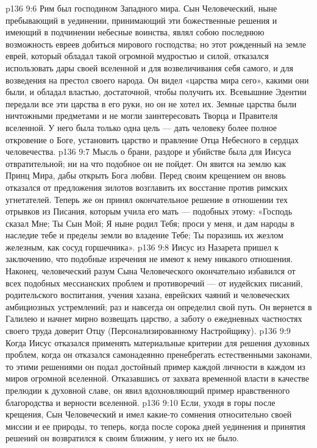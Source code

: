 \vs p136 9:6 Рим был господином Западного мира. Сын Человеческий, ныне пребывающий в уединении, принимающий эти божественные решения и имеющий в подчинении небесные воинства, являл собою последнюю возможность евреев добиться мирового господства; но этот рожденный на земле еврей, который обладал такой огромной мудростью и силой, отказался использовать дары своей вселенной и для возвеличивания себя самого, и для возведения на престол своего народа. Он видел «царства мира сего», какими они были, и обладал властью, достаточной, чтобы получить их. Всевышние Эдентии передали все эти царства в его руки, но он не хотел их. Земные царства были ничтожными предметами и не могли заинтересовать Творца и Правителя вселенной. У него была только одна цель --- дать человеку более полное откровение о Боге, установить царство и правление Отца Небесного в сердцах человечества.
\vs p136 9:7 Мысль о брани, раздоре и убийстве была для Иисуса отвратительной; ни на что подобное он не пойдет. Он явится на землю как Принц Мира, дабы открыть Бога любви. Перед своим крещением он вновь отказался от предложения зилотов возглавить их восстание против римских угнетателей. Теперь же он принял окончательное решение в отношении тех отрывков из Писания, которым учила его мать --- подобных этому: «Господь сказал Мне; Ты Сын Мой; Я ныне родил Тебя; проси у меня, и дам народы в наследие тебе и пределы земли во владение Тебе; Ты поразишь их жезлом железным, как сосуд горшечника».
\vs p136 9:8 Иисус из Назарета пришел к заключению, что подобные изречения не имеют к нему никакого отношения. Наконец, человеческий разум Сына Человеческого окончательно избавился от всех подобных мессианских проблем и противоречий --- от иудейских писаний, родительского воспитания, учения хазана, еврейских чаяний и человеческих амбициозных устремлений; раз и навсегда он определил свой путь. Он вернется в Галилею и начнет мирно возвещать царство, а заботу о ежедневных частностях своего труда доверит Отцу (Персонализированному Настройщику).
\vs p136 9:9 \pc Когда Иисус отказался применять материальные критерии для решения духовных проблем, когда он отказался самонадеянно пренебрегать естественными законами, то этими решениями он подал достойный пример каждой личности в каждом из миров огромной вселенной. Отказавшись от захвата временной власти в качестве прелюдии к духовной славе, он явил вдохновляющий пример нравственного благородства и верности вселенной.
\vs p136 9:10 \pc Если, уходя в горы после крещения, Сын Человеческий и имел какие\hyp{}то сомнения относительно своей миссии и ее природы, то теперь, когда после сорока дней уединения и принятия решений он возвратился к своим ближним, у него их не было.
